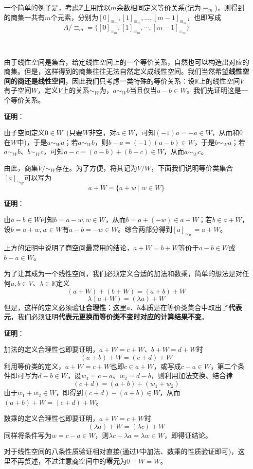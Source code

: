 \documentclass[a4paper,UTF8,fontset=windows,AutoFakeBold]{ctexart}
\newcommand*{\note}{\noindent *}
\newcommand{\proo}[1]{{\vspace{5pt}\kaishu\noindent\textbf{证明}：\vspace{-3pt}
\begin{compactitem}
    \item[] #1
\end{compactitem}
}}
\begin{document}
\note 一个简单的例子是，考虑$\mathbb{Z}$上用除以$m$余数相同定义等价关系(记为$\equiv_m$)，则得到的商集一共有$m$个元素，分别为$[0]_{\equiv_m},[1]_{\equiv_m},\dots,[m-1]_{\equiv_m}$，也即写成
$$A/\equiv_m=\{[0]_{\equiv_m},[1]_{\equiv_m},\cdots,[m-1]_{\equiv_m}\}$$

\

由于线性空间是集合，给定线性空间上的一个等价关系，自然也可以构造出对应的商集。但是，这样得到的商集往往无法自然定义成线性空间。我们当然希望\textbf{线性空间的商还是线性空间}，因此我们只考虑一类特殊的等价关系：设$\mathbb{K}$上的线性空间$V$有子空间$W$，定义$V$上的关系$\sim_W$为，$a\sim_Wb$当且仅当$a-b\in W$。我们先证明这是一个等价关系。

\proo{
    由子空间定义$0\in W$\ (只要$W$非空，对$a\in W$，可知$(-1)a=-a\in W$，从而和0在$W$中)，于是$a\sim_Wa$；若$a\sim_Wb$，则$b-a=(-1)(a-b)\in W$，于是$b\sim_Wa$；若$a\sim_Wb$、$b\sim_Wc$，可知$a-c=(a-b)+(b-c)\in W$，从而$a\sim_Wc$。
}

\noindent 由此，商集$V/\sim_W$存在。为了方便，将其记为$V/W$，下面我们说明等价类集合$[a]_{\sim_W}$可以写为
$$a+W=\{a+w\mid w\in W\}$$

\proo{
    由$a-b\in W$可知$b=a-w,w\in W$，从而$b=a+(-w)\in a+W$；若$b\in a+W$，设$b=a+w,w\in W$有$a-b=-w\in W$。综合两部分得到$[a]_{\sim_W}=a+W$。
}

\note 上方的证明中说明了商空间最常用的结论，$a+W=b+W$等价于$a-b\in W$或$b-a\in W$。

为了让其成为一个线性空间，我们必须定义合适的加法和数乘，简单的想法是对任何$a,b\in V$、$\lambda\in\mathbb{K}$定义
$$(a+W)+(b+W)=(a+b)+W$$
$$\lambda(a+W)=(\lambda a)+W$$
但是，这样的定义必须验证\textbf{合理性}：这里$a$、$b$本质是在等价类集合中取出了\textbf{代表元}，我们必须证明\textbf{代表元更换而等价类不变时对应的计算结果不变}。

\proo{
    加法的定义合理性也即要证明，$a+W=c+W$、$b+W=d+W$时
    $$(a+b)+W=(c+d)+W$$
    利用等价类的定义，$a+W=c+W$也即$c\in a+W$，或写成$c-a\in W$，第二个条件即可写为$d-b\in W$，设$w_1=c-a$、$w_2=d-b$，则利用加法交换、结合律
    $$(c+d)=(a+b)+(w_1+w_2)$$
    由于$w_1+w_2\in W$，即得到$(c+d)-(a+b)\in W$，从而$(a+b)+W=(c+d)+W$。

    数乘的定义合理性也即要证明，$a+W=c+W$时
    $$(\lambda a)+W=(\lambda c)+W$$
    同样将条件写为$w=c-a\in W$，则$\lambda c-\lambda a=\lambda w\in W$，即得证结论。
}

\note 对于线性空间的八条性质验证相对直接(通过$V$中加法、数乘的性质验证即可)，这里不再赘述，不过注意商空间中的\textbf{零元}为$0+W=W$。
\end{document}
